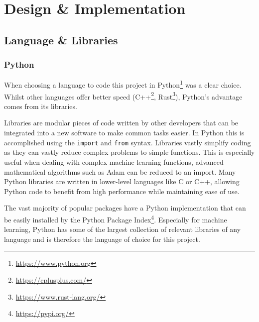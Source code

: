 \chapter{Design \& Implementation}
\label{ch:design-implementation}

\section{Language \& Libraries}


\subsection{Python}

When choosing a language to code this project in Python\footnote{\url{https://www.python.org}} was a clear choice. Whilst other languages offer better speed (C++\footnote{\url{https://cplusplus.com/}}, Rust\footnote{\url{https://www.rust-lang.org/}}), Python's advantage comes from its libraries.

Libraries are modular pieces of code written by other developers that can be integrated into a new software to make common tasks easier. In Python this is accomplished using the \verb|import| and \verb|from| syntax. Libraries vastly simplify coding as they can vastly reduce complex problems to simple functions. This is especially useful when dealing with complex machine learning functions, advanced mathematical algorithms such as Adam can be reduced to an import. Many Python libraries are written in lower-level languages like C or C++, allowing Python code to benefit from high performance while maintaining ease of use.

The vast majority of popular packages have a Python implementation that can be easily installed by the Python Package Index\footnote{\url{https://pypi.org/}}. Especially for machine learning, Python has some of the largest collection of relevant libraries of any language and is therefore the language of choice for this project.

